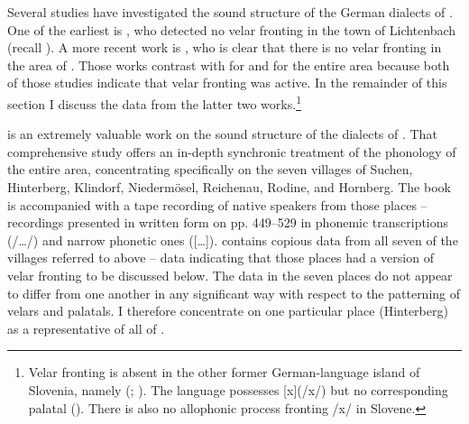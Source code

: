 {Several studies have investigated the sound structure of the German dialects of . One of the earliest is \citet{Tschinkel1908}, who detected no velar fronting in the town of Lichtenbach (recall ). A more recent work is \citet[37]{Wolf1982}, who is clear that there is no velar fronting in the area of . Those works contrast with \citet{Seemüller1909d} for  and \citet{Lipold1984} for the entire  area because both of those studies indicate that velar fronting was active. In the remainder of this section I discuss the data from the latter two works.\footnote{Velar fronting is absent in the other former German-language island of Slovenia, namely  (\citealt{Lessiak1959}; ). The  language possesses [x](/x/) but no corresponding palatal (\citealt{Greenberg2006}). There is also no allophonic process fronting /x/ in Slovene.}

\citet{Lipold1984} is an extremely valuable work on the sound structure of the dialects of . That comprehensive study offers an in-depth synchronic treatment of the phonology of the entire area, concentrating specifically on the seven villages of Suchen, Hinterberg, Klindorf, Niedermösel, Reichenau, Rodine, and Hornberg. The book is accompanied with a tape recording of native speakers from those places -- recordings presented in written form on pp. 449--529 in phonemic transcriptions (/…/) and narrow phonetic ones ([…]). \citet{Lipold1984} contains copious data from all seven of the villages referred to above -- data indicating that those places had a version of velar fronting to be discussed below. The data in the seven places do not appear to differ from one another in any significant way with respect to the patterning of velars and palatals. I therefore concentrate on one particular place (Hinterberg) as a representative of all of .

}
